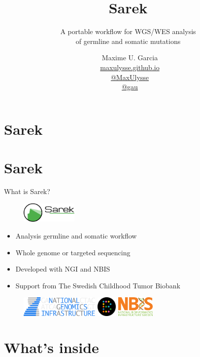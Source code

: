\documentclass[usepdftitle=false]{beamer}
\title{%
	\vspace{-.8cm}%
	Sarek
}
\subtitle{%
	\normalsize{A portable workflow for WGS/WES analysis\\of germline and somatic mutations}%
	\vspace{-.4cm}%
}
\author{
	\vspace{-.6cm}
	\faUser\ Maxime U. Garcia\\
	\faGlobe\ \href{https://maxulysse.github.io/}{maxulysse.github.io}\\
	\faGithub\ \href{https://github.com/MaxUlysse/}{@MaxUlysse}\\
	\faTwitter\ \href{https://twitter.com/gau/}{@gau}\\
}
\date{\vfill}
\begin{document}
\section{Sarek}


\section{Sarek}

\begin{frame}{What is Sarek?}
	\begin{figure}
		\includegraphics[height=1cm]{pictures/Sarek_no_border}
	\end{figure}
	\begin{itemize}
		\item Analysis germline and somatic workflow
		\item Whole genome or targeted sequencing
		\item Developed with NGI and NBIS
		\item Support from The Swedish Childhood Tumor Biobank
	\end{itemize}
	\begin{figure}
		\includegraphics[height=1cm]{pictures/NGI}
		{\hfill}
		\includegraphics[height=1cm]{pictures/Barntumorbanken}
		{\hfill}
		\includegraphics[height=1cm]{pictures/NBIS}
	\end{figure}
	\vfill
\end{frame}

\section{What's inside}
\end{document}
